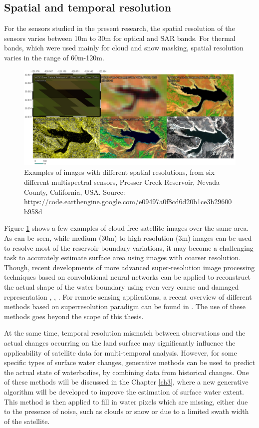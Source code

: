 \subsection{Spatial and temporal resolution}
For the sensors studied in the present research, the spatial resolution of the sensors varies between 10m to 30m for optical and SAR bands. For thermal bands, which were used mainly for cloud and snow masking, spatial resolution varies in the range of 60m-120m. 

\begin{figure}
	\includegraphics[width=1.0\textwidth,left]{01.1-introduction/figures/example-resolutions}
	\caption{Examples of images with different spatial resolutions, from six different multispectral sensors, Prosser Creek Reservoir, Nevada County, California, USA. Source: \url{https://code.earthengine.google.com/e09497a0f8cd6d20b1ce3b29600b958d}}
	\label{fig:example-resolutions}
\end{figure}

Figure \ref{fig:example-resolutions} shows a few examples of cloud-free satellite images over the same area. As can be seen, while medium (30m) to high resolution (3m) images can be used to resolve most of the reservoir boundary variations, it may become a challenging task to accurately estimate surface area using images with coarser resolution. Though, recent developments of more advanced super-resolution image processing techniques based on convolutional neural networks can be applied to reconstruct the actual shape of the water boundary using even very coarse and damaged representation \citep{ledig2016photo}, \citep{shi2016real}, \citep{johnson2016perceptual}. For remote sensing applications, a recent overview of different methods based on superresolution paradigm can be found in \citep{garzelli2016review}. The use of these methods goes beyond the scope of this thesis.

At the same time, temporal resolution mismatch between observations and the actual changes occurring on the land surface may significantly influence the applicability of satellite data for multi-temporal analysis. However, for some specific types of surface water changes, generative methods can be used to predict the actual state of waterbodies, by combining data from historical changes. One of these methods will be discussed in the Chapter \ref{ch3}, where a new generative algorithm will be developed to improve the estimation of surface water extent. This method is then applied to fill in water pixels which are missing, either due to the presence of noise, such as clouds or snow or due to a limited swath width of the satellite.

